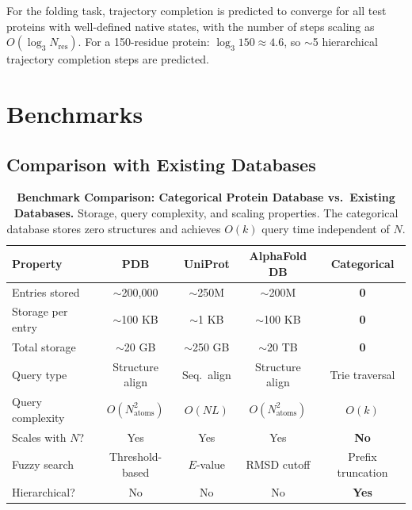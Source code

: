 \documentclass[11pt,twocolumn,a4paper]{article}
\theoremstyle{definition}
\theoremstyle{remark}
\newcommand{\Nres}{N_{\mathrm{res}}}
\begin{document}
For the folding task, trajectory completion is predicted to converge for all test proteins with well-defined native states, with the number of steps scaling as $O(\log_3 \Nres)$. For a 150-residue protein: $\log_3 150 \approx 4.6$, so $\sim$5 hierarchical trajectory completion steps are predicted.



\section{Benchmarks}
\label{sec:benchmarks}

\subsection{Comparison with Existing Databases}

\begin{table}[!htbp]
\centering
\caption{\textbf{Benchmark Comparison: Categorical Protein Database vs.\ Existing Databases.} Storage, query complexity, and scaling properties. The categorical database stores zero structures and achieves $O(k)$ query time independent of $N$.}
\label{tab:benchmarks}
\begin{tabular}{@{}lcccc@{}}
\toprule
Property & PDB & UniProt & AlphaFold DB & Categorical \\
\midrule
Entries stored & $\sim$200{,}000 & $\sim$250M & $\sim$200M & \textbf{0} \\
Storage per entry & $\sim$100 KB & $\sim$1 KB & $\sim$100 KB & \textbf{0} \\
Total storage & $\sim$20 GB & $\sim$250 GB & $\sim$20 TB & \textbf{0} \\
Query type & Structure align & Seq.\ align & Structure align & Trie traversal \\
Query complexity & $O(N_{\mathrm{atoms}}^2)$ & $O(NL)$ & $O(N_{\mathrm{atoms}}^2)$ & $O(k)$ \\
Scales with $N$? & Yes & Yes & Yes & \textbf{No} \\
Fuzzy search & Threshold-based & $E$-value & RMSD cutoff & Prefix truncation \\
Hierarchical? & No & No & No & \textbf{Yes} \\
\bottomrule
\end{tabular}
\end{table}
\end{document}
